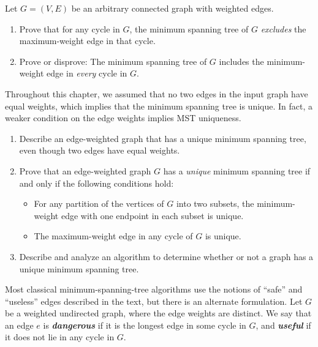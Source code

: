 \begin{exercises}

\item Let $G = (V, E)$ be an arbitrary connected graph with weighted edges.

\begin{enumerate}
\item Prove that for any cycle in $G$, the minimum spanning tree of $G$ \textit{excludes} the maximum-weight edge in that cycle.

\item Prove or disprove: The minimum spanning tree of $G$ includes the minimum-weight edge in \textit{every} cycle in $G$.

\end{enumerate}

\item Throughout this chapter, we assumed that no two edges in the input graph have equal weights, which implies that the minimum spanning tree is unique. In fact, a weaker condition on the edge weights implies MST uniqueness.

\begin{enumerate}
\item Describe an edge-weighted graph that has a unique minimum spanning tree, even though two edges have equal weights.

\item Prove that an edge-weighted graph $G$ has a \textit{unique} minimum spanning tree if and only if the following conditions hold:

\begin{itemize}
\item For any partition of the vertices of $G$ into two subsets, the minimum-weight edge with one endpoint in each subset is unique.
\item The maximum-weight edge in any cycle of $G$ is unique.
\end{itemize}

\item Describe and analyze an algorithm to determine whether or not a graph has a unique minimum spanning tree.

\end{enumerate}

\item Most classical minimum-spanning-tree algorithms use the notions of “safe” and “useless” edges described in the text, but there is an alternate formulation. Let $G$ be a weighted undirected graph, where the edge weights are distinct. We say that an edge $e$ is \textbf{\textit{dangerous}} if it is the longest edge in some cycle in $G$, and \textbf{\textit{useful}} if it does not lie in any cycle in $G$.


\end{exercises}
